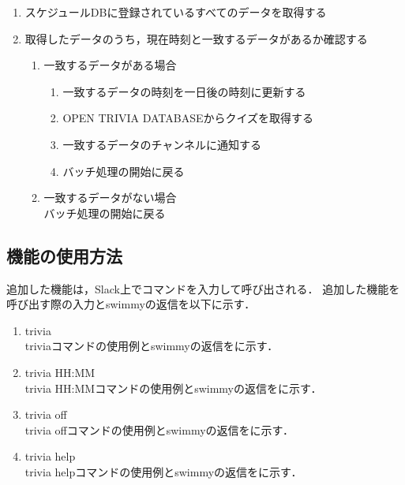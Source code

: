 \documentclass[12pt]{jsarticle}
\begin{document}
\begin{description}
\begin{enumerate}
      \item スケジュールDBに登録されているすべてのデータを取得する
      \item 取得したデータのうち，現在時刻と一致するデータがあるか確認する
        \begin{enumerate}
          \item 一致するデータがある場合
            \begin{enumerate}
              \item 一致するデータの時刻を一日後の時刻に更新する
              \item OPEN TRIVIA DATABASEからクイズを取得する
              \item 一致するデータのチャンネルに通知する
              \item バッチ処理の開始に戻る
            \end{enumerate}
          \item 一致するデータがない場合\\
            バッチ処理の開始に戻る
        \end{enumerate}
    \end{enumerate}
\end{description}

\subsection{機能の使用方法}
追加した機能は，Slack上でコマンドを入力して呼び出される．
追加した機能を呼び出す際の入力とswimmyの返信を以下に示す．
\begin{enumerate}
  \item trivia\\
    triviaコマンドの使用例とswimmyの返信をに示す．
  \item trivia HH:MM\\
    trivia HH:MMコマンドの使用例とswimmyの返信をに示す．
  \item trivia off\\
    trivia offコマンドの使用例とswimmyの返信をに示す．
  \item trivia help\\
    trivia helpコマンドの使用例とswimmyの返信をに示す．
\end{enumerate}
\end{document}
